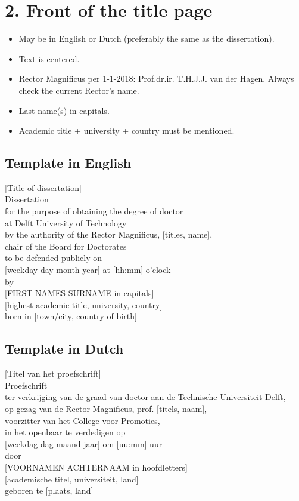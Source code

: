 \section*{2. Front of the title page}
\begin{itemize}
\item May be in English or Dutch (preferably the same as the dissertation).  
\item Text is centered.  
\item Rector Magnificus per 1-1-2018: Prof.dr.ir. T.H.J.J. van der Hagen. Always check the current Rector’s name.  
\item Last name(s) in capitals.  
\item Academic title + university + country must be mentioned.  
\end{itemize}

\subsection*{Template in English}
\begin{center}
[Title of dissertation] \\[1em]
Dissertation \\[1em]
for the purpose of obtaining the degree of doctor \\[0.5em]
at Delft University of Technology \\[0.5em]
by the authority of the Rector Magnificus, [titles, name], \\[0.5em]
chair of the Board for Doctorates \\[1em]
to be defended publicly on \\[0.5em]
[weekday day month year] at [hh:mm] o’clock \\[1em]
by \\[1em]
[FIRST NAMES SURNAME in capitals] \\[0.5em]
[highest academic title, university, country] \\[0.5em]
born in [town/city, country of birth]
\end{center}

\subsection*{Template in Dutch}
\begin{center}
[Titel van het proefschrift] \\[1em]
Proefschrift \\[1em]
ter verkrijging van de graad van doctor aan de Technische Universiteit Delft, \\[0.5em]
op gezag van de Rector Magnificus, prof. [titels, naam], \\[0.5em]
voorzitter van het College voor Promoties, \\[1em]
in het openbaar te verdedigen op \\[0.5em]
[weekdag dag maand jaar] om [uu:mm] uur \\[1em]
door \\[1em]
[VOORNAMEN ACHTERNAAM in hoofdletters] \\[0.5em]
[academische titel, universiteit, land] \\[0.5em]
geboren te [plaats, land]
\end{center}

